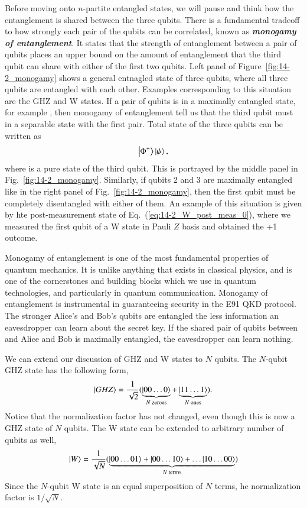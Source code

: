 Before moving onto $n$-partite entangled states, we will pause and think how the entanglement is shared between the three qubits.
There is a fundamental tradeoff to how strongly each pair of the qubits can be correlated, known as \textit{\textbf{monogamy of entanglement}}.
It states that the strength of entanglement between a pair of qubits places an upper bound on the amount of entanglement that the third qubit can share with either of the first two qubits.
Left panel of Figure~\ref{fig:14-2_monogamy} shows a general entnagled state of three qubits, where all three qubits are entangled with each other.
Examples corresponding to this situation are the GHZ and W states.
If a pair of qubits is in a maximally entangled state, for example \ket{\Phi+}, then monogamy of entanglement tell us that the third qubit must in a separable state with the first pair.
Total state of the three qubits can be written as
\begin{equation}
    \left| \Phi^+ \right\rangle\left| \psi \right\rangle,
\end{equation}
where \ket{\psi} is a pure state of the third qubit.
This is portrayed by the middle panel in Fig.~\ref{fig:14-2_monogamy}.
Similarly, if qubits 2 and 3 are maximally entangled like in the right panel of Fig.~\ref{fig:14-2_monogamy}, then the first qubit must be completely disentangled with either of them.
An example of this situation is given by hte post-measurement state of Eq.~(\ref{eq:14-2_W_post_meas_0}), where we measured the first qubit of a W state in Pauli $Z$ basis and obtained the +1 outcome.

Monogamy of entanglement is one of the most fundamental properties of quantum mechanics. It is unlike anything that exists in classical physics, and is one of the cornerstones and building blocks which we use in quantum technologies, and particularly in quantum communication.
Monogamy of entanglement is instrumental in guaranteeing security in the E91 QKD protocol.
The stronger Alice's and Bob's qubits are entangled the less information an eavesdropper can learn about the secret key.
If the shared pair of qubits between and Alice and Bob is maximally entangled, the eavesdropper can learn nothing.

We can extend our discussion of GHZ and W states to $N$ qubits.
The $N$-qubit GHZ state has the following form,
\begin{equation}
    \left| GHZ \right\rangle = \frac{1}{\sqrt{2}} ( \underbrace{\left| 00\ldots0 \right\rangle}_{N\text{ zeroes}} + \underbrace{\left| 11\ldots1 \right\rangle}_{N \text{ ones}} ).
\end{equation}
Notice that the normalization factor has not changed, even though this is now a GHZ state of $N$ qubits.
The W state can be extended to arbitrary number of qubits as well,
\begin{equation}
    \left| W \right\rangle = \frac{1}{\sqrt{N}} ( \underbrace{\left| 00\ldots01 \right\rangle + \left| 00\ldots10 \right\rangle + \ldots \left| 10\ldots00 \right\rangle}_{N \text{ terms}} )
\end{equation}
Since the $N$-qubit W state is an equal superposition of $N$ terms, he normalization factor is $1 / \sqrt{N}$.

